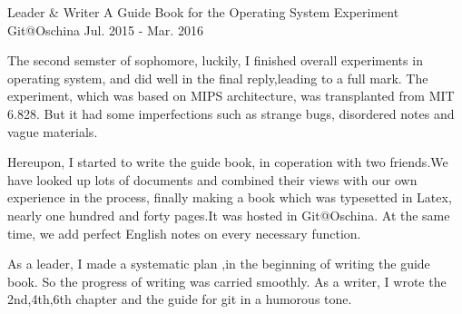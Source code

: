 


\begin{cventries}


\cventry
{Leader \& Writer} %
{A Guide Book for the Operating System Experiment} %
{Git@Oschina} %
{Jul. 2015 - Mar. 2016} %
{ %
\begin{cvitems}
\item {The second semster of sophomore, luckily, I finished overall experiments in operating system, and did well in the final reply,leading to a full mark. The experiment, which was based on MIPS architecture, was transplanted from MIT 6.828. But it had some imperfections such as strange bugs, disordered notes and vague materials.}
\item {Hereupon, I started to write the guide book, in coperation with two friends.We have looked up lots of documents and combined their views with our own experience in the process, finally making a book which was typesetted in Latex, nearly one hundred and forty pages.It was hosted in Git@Oschina. At the same time, we add perfect English notes on every necessary function.	
}
\item {
	As a leader, I made a systematic plan ,in the beginning of writing the guide book. So the progress of writing was carried smoothly. As a writer, I wrote the 2nd,4th,6th chapter and the guide for git in a humorous tone.
}
\end{cvitems}
}


\end{cventries}